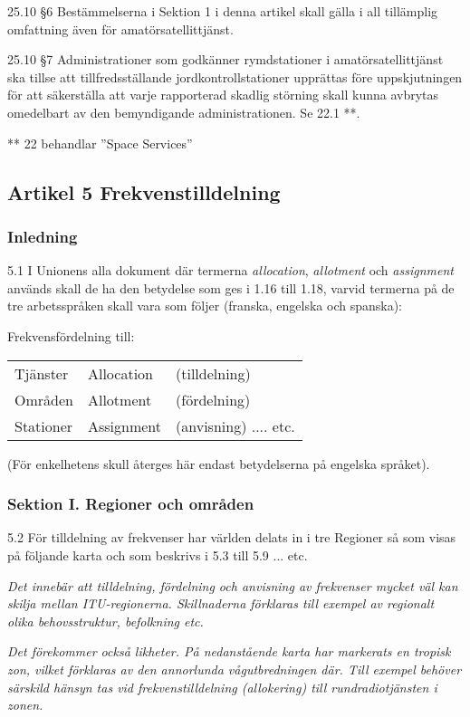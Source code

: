 25.10 \S6 Bestämmelserna i Sektion 1 i denna artikel skall gälla i all
tillämplig omfattning även för amatörsatellittjänst.
\cite[25.10]{ITU-RR}

25.10 \S7 Administrationer som godkänner rymdstationer i amatörsatellittjänst
ska tillse att tillfredsställande jordkontrollstationer upprättas före
uppskjutningen för att säkerställa att varje rapporterad skadlig störning
skall kunna avbrytas omedelbart av den bemyndigande administrationen.
Se 22.1 **.
\cite[25.11]{ITU-RR}

** 22 behandlar ''Space Services''

\subsection{Artikel 5 Frekvenstilldelning}

\subsubsection{Inledning}

5.1 I Unionens alla dokument där termerna \emph{allocation},
\emph{allotment} och \emph{assignment} används skall de ha den
betydelse som ges i 1.16 till 1.18, varvid termerna på de tre
arbetsspråken skall vara som följer (franska, engelska och spanska):
\cite[5.1]{ITU-RR}

Frekvensfördelning till:

\begin{tabular}{lll}
  Tjänster & Allocation & (tilldelning) \\
  Områden & Allotment & (fördelning) \\
  Stationer & Assignment & (anvisning) .... etc. \\
\end{tabular}

(För enkelhetens skull återges här endast betydelserna på engelska språket).

\subsubsection{Sektion I. Regioner och områden}

5.2 För tilldelning av frekvenser har världen delats in i tre
Regioner så som visas på följande karta och som beskrivs i 5.3 till
5.9 ... etc.
\cite[5.2]{ITU-RR}

\emph{ Det innebär att tilldelning, fördelning och anvisning av frekvenser
  mycket väl kan skilja mellan ITU-regionerna.
  Skillnaderna förklaras till exempel av regionalt olika behovsstruktur, befolkning
  etc.}

\emph{Det förekommer också likheter.
  På nedanstående karta har markerats en tropisk zon, vilket förklaras av den
  annorlunda vågutbredningen där.
  Till exempel behöver särskild hänsyn tas vid frekvenstilldelning (allokering) till
  rundradiotjänsten i zonen.}

